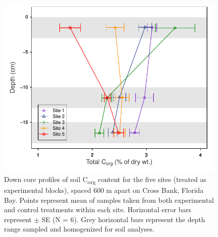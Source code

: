 \begin{figure}
  \centering
  \includegraphics[width=.95\textwidth]{Figures/chapter1/fig8}
\caption[Down core profiles of soil C\textsubscript{org} content for the five sites (treated as experimental blocks), spaced 600 m apart on Cross Bank, Florida Bay. Points represent mean of samples taken from both experimental and control treatments within each site. Horizontal error bars represent $\pm$ SE (N = 6). Grey horizontal bars represent the depth range sampled and homogenized for soil analyses]{Down core profiles of soil C\textsubscript{org} content for the five sites (treated as experimental blocks), spaced 600 m apart on Cross Bank, Florida Bay. Points represent mean of samples taken from both experimental and control treatments within each site. Horizontal error bars represent $\pm$ SE (N = 6). Grey horizontal bars represent the depth range sampled and homogenized for soil analyses.}
  \label{fig:1fig8}
\end{figure}

